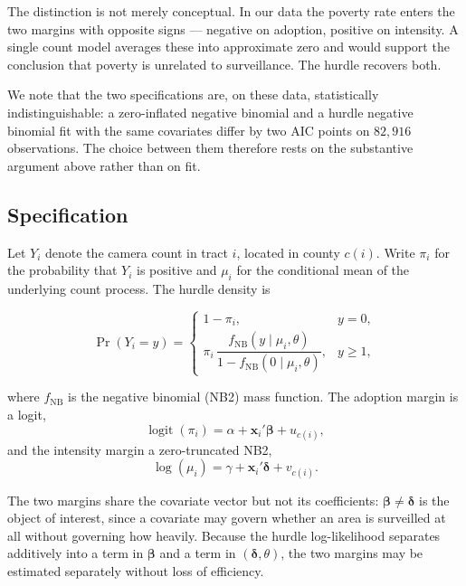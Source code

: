 The distinction is not merely conceptual. In our data the poverty rate enters
the two margins with opposite signs --- negative on adoption, positive on
intensity. A single count model averages these into approximate zero and would
support the conclusion that poverty is unrelated to surveillance. The hurdle
recovers both.

We note that the two specifications are, on these data, statistically
indistinguishable: a zero-inflated negative binomial and a hurdle negative
binomial fit with the same covariates differ by two AIC points on $82{,}916$
observations. The choice between them therefore rests on the substantive
argument above rather than on fit.

\subsection{Specification}

Let $Y_i$ denote the camera count in tract $i$, located in county $c(i)$. Write
$\pi_i$ for the probability that $Y_i$ is positive and $\mu_i$ for the
conditional mean of the underlying count process. The hurdle density is

\begin{equation}
\Pr(Y_i = y) =
\begin{cases}
1 - \pi_i, & y = 0,\\[6pt]
\pi_i \, \dfrac{f_{\mathrm{NB}}(y \mid \mu_i, \theta)}
               {1 - f_{\mathrm{NB}}(0 \mid \mu_i, \theta)}, & y \geq 1,
\end{cases}
\label{eq:hurdle}
\end{equation}

where $f_{\mathrm{NB}}$ is the negative binomial (NB2) mass function. The
adoption margin is a logit,
\begin{equation}
\operatorname{logit}(\pi_i) = \alpha + \mathbf{x}_i'\boldsymbol{\beta} + u_{c(i)},
\end{equation}
and the intensity margin a zero-truncated NB2,
\begin{equation}
\log(\mu_i) = \gamma + \mathbf{x}_i'\boldsymbol{\delta} + v_{c(i)}.
\end{equation}

The two margins share the covariate vector but not its coefficients:
$\boldsymbol{\beta} \neq \boldsymbol{\delta}$ is the object of interest, since a
covariate may govern whether an area is surveilled at all without governing how
heavily. Because the hurdle log-likelihood separates additively into a term in
$\boldsymbol{\beta}$ and a term in $(\boldsymbol{\delta}, \theta)$, the two
margins may be estimated separately without loss of efficiency.

